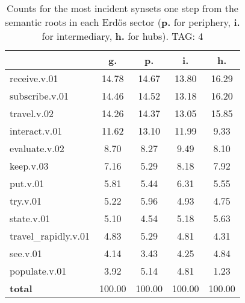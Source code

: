 \begin{table}[h!]
\begin{center}
\begin{tabular}{| l || c | c | c | c |}\hline
 & {\bf g.} & {\bf p.} & {\bf i.} & {\bf h.} \\\hline\hline
receive.v.01 & 14.78  & 14.67  & 13.80  & 16.29 \\\hline
subscribe.v.01 & 14.46  & 14.52  & 13.18  & 16.20 \\\hline
travel.v.02 & 14.26  & 14.37  & 13.05  & 15.85 \\\hline
interact.v.01 & 11.62  & 13.10  & 11.99  & 9.33 \\\hline
evaluate.v.02 & 8.70  & 8.27  & 9.49  & 8.10 \\\hline
keep.v.03 & 7.16  & 5.29  & 8.18  & 7.92 \\\hline
put.v.01 & 5.81  & 5.44  & 6.31  & 5.55 \\\hline
try.v.01 & 5.22  & 5.96  & 4.93  & 4.75 \\\hline
state.v.01 & 5.10  & 4.54  & 5.18  & 5.63 \\\hline
travel\_rapidly.v.01 & 4.83  & 5.29  & 4.81  & 4.31 \\\hline
see.v.01 & 4.14  & 3.43  & 4.25  & 4.84 \\\hline
populate.v.01 & 3.92  & 5.14  & 4.81  & 1.23 \\\hline\hline
{{\bf total}} & 100.00  & 100.00  & 100.00  & 100.00 \\\hline
\end{tabular}
\caption{Counts for the most incident synsets one step from the semantic roots in each Erd\"os sector ({\bf p.} for periphery, {\bf i.} for intermediary, {\bf h.} for hubs). TAG: 4}
\end{center}
\end{table}